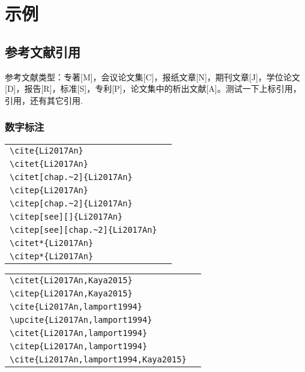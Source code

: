 \chapter{示例}
\label{sec:sample}
\section{参考文献引用}
参考文献类型：专著[M]，会议论文集[C]，报纸文章[N]，期刊文章[J]，学位论文[D]，报告[R]，标准[S]，专利[P]，论文集中的析出文献[A]。测试一下上标引用，引用\cite{Le2016Multiple,Kaya2015,tf2017}，还有其它引用.
\subsection{数字标注}
\noindent
\begin{tabular}{l@{\quad$\Rightarrow$\quad}l}
	\verb|\cite{Li2017An}| & \cite{Li2017An}\\
	\verb|\citet{Li2017An}| & \citet{Li2017An}\\
	\verb|\citet[chap.~2]{Li2017An}| & \citet[chap.~2]{Li2017An}\\[0.5ex]
	\verb|\citep{Li2017An}| & \citep{Li2017An}\\
	\verb|\citep[chap.~2]{Li2017An}| & \citep[chap.~2]{Li2017An}\\
	\verb|\citep[see][]{Li2017An}| & \citep[see][]{Li2017An}\\
	\verb|\citep[see][chap.~2]{Li2017An}| & \citep[see][chap.~2]{Li2017An}\\[0.5ex]
	\verb|\citet*{Li2017An}| & \citet*{Li2017An}\\
	\verb|\citep*{Li2017An}| & \citep*{Li2017An}\\
\end{tabular}
\par\noindent
\begin{tabular}{l@{\quad$\Rightarrow$\quad}l}
	\verb|\citet{Li2017An,Kaya2015}| & \citet{Li2017An,Kaya2015}\\
	\verb|\citep{Li2017An,Kaya2015}| & \citep{Li2017An,Kaya2015}\\
	\verb|\cite{Li2017An,lamport1994}| & \cite{Li2017An,lamport1994}\\
	\verb|\upcite{Li2017An,lamport1994}| & \upcite{Li2017An,lamport1994}\\
	\verb|\citet{Li2017An,lamport1994}| & \citet{Li2017An,lamport1994}\\
	\verb|\citep{Li2017An,lamport1994}| & \citep{Li2017An,lamport1994}\\
	\verb|\cite{Li2017An,lamport1994,Kaya2015}| & \cite{Li2017An,lamport1994,Kaya2015}\\
\end{tabular}

